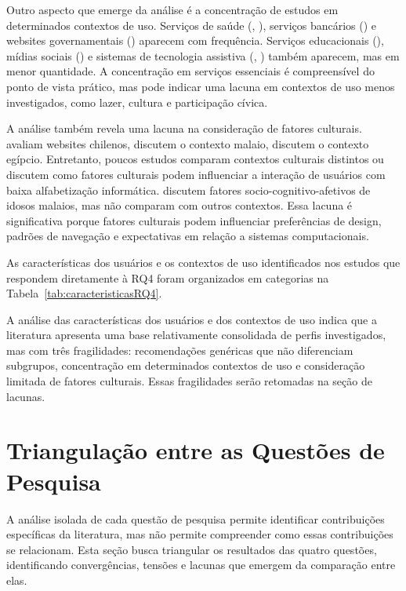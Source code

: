 Outro aspecto que emerge da análise é a concentração de estudos em determinados contextos de uso. Serviços de saúde (\cite{barron2013feasibility}, \cite{health_problem_solving}), serviços bancários (\cite{gatsou2017seniors}) e websites governamentais (\cite{health_problem_solving}) aparecem com frequência. Serviços educacionais (\cite{kabassi2004personalised}), mídias sociais (\cite{social_media_elderly}) e sistemas de tecnologia assistiva (\cite{breaking_barriers}, \cite{kusumaningayu2017web}) também aparecem, mas em menor quantidade. A concentração em serviços essenciais é compreensível do ponto de vista prático, mas pode indicar uma lacuna em contextos de uso menos investigados, como lazer, cultura e participação cívica.

A análise também revela uma lacuna na consideração de fatores culturais. \cite{dombrovskaia2021guideline} avaliam websites chilenos, \cite{ahmad2013teaching} discutem o contexto malaio, \cite{nosseir2011novice} discutem o contexto egípcio. Entretanto, poucos estudos comparam contextos culturais distintos ou discutem como fatores culturais podem influenciar a interação de usuários com baixa alfabetização informática. \cite{lee2021factors} discutem fatores socio-cognitivo-afetivos de idosos malaios, mas não comparam com outros contextos. Essa lacuna é significativa porque fatores culturais podem influenciar preferências de design, padrões de navegação e expectativas em relação a sistemas computacionais.

As características dos usuários e os contextos de uso identificados nos estudos que respondem diretamente à RQ4 foram organizados em categorias na Tabela~\ref{tab:caracteristicasRQ4}.



A análise das características dos usuários e dos contextos de uso indica que a literatura apresenta uma base relativamente consolidada de perfis investigados, mas com três fragilidades: recomendações genéricas que não diferenciam subgrupos, concentração em determinados contextos de uso e consideração limitada de fatores culturais. Essas fragilidades serão retomadas na seção de lacunas.


\section{Triangulação entre as Questões de Pesquisa}

\label{sec:triangulacao}

A análise isolada de cada questão de pesquisa permite identificar contribuições específicas da literatura, mas não permite compreender como essas contribuições se relacionam. Esta seção busca triangular os resultados das quatro questões, identificando convergências, tensões e lacunas que emergem da comparação entre elas.

